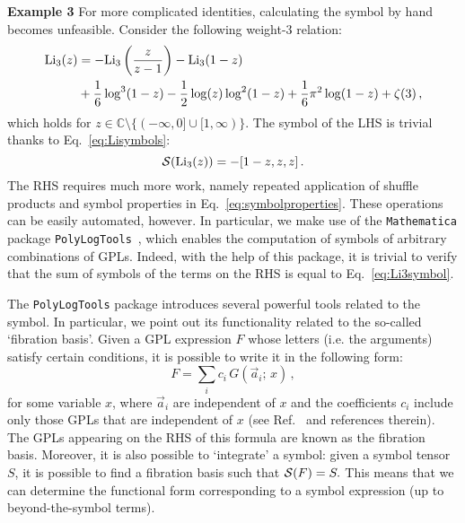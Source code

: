 \documentclass[main.tex]{subfiles}
\begin{document}
\textbf{Example 3} \newline
For more complicated identities, calculating the symbol by hand becomes unfeasible. Consider the following weight-3 relation:
\begin{align}
    \text{Li}_3(z)&=-\text{Li}_3\left(\frac{z}{z-1}\right)-\text{Li}_3(1-z) \nonumber \\
    &+\frac{1}{6} \log ^3(1-z)-\frac{1}{2} \log (z) \log ^2(1-z)+\frac{1}{6} \pi ^2 \log (1-z)+\zeta (3)\,,
\end{align}
which holds for $z \in \mathbb{C} \setminus\{(-\infty, 0] \cup [1, \infty)\}$. The symbol of the LHS is trivial thanks to Eq.~\ref{eq:Lisymbols}:
\begin{equation} \label{eq:Li3symbol}
    \mathcal{S}(\text{Li}_3(z)) = -[1-z,z,z]\,.
\end{equation}
The RHS requires much more work, namely repeated application of shuffle products and symbol properties in Eq.~\ref{eq:symbolproperties}. These operations can be easily automated, however. In particular, we make use of the \texttt{Mathematica} package \texttt{PolyLogTools}~\cite{Duhr:2019tlz}, which enables the computation of symbols of arbitrary combinations of GPLs. Indeed, with the help of this package, it is trivial to verify that the sum of symbols of the terms on the RHS is equal to Eq.~\ref{eq:Li3symbol}.

The \texttt{PolyLogTools} package introduces several powerful tools related to the symbol. In particular, we point out its functionality related to the so-called `fibration basis'. Given a GPL expression $F$ whose letters (i.e. the arguments) satisfy certain conditions, it is possible to write it in the following form:
\begin{equation}
    F = \sum_i c_i\, G(\vec{a}_i;\, x)\,,
\end{equation}
for some variable $x$, where $\vec{a}_i$ are independent of $x$ and the coefficients $c_i$ include only those GPLs that are independent of $x$ (see Ref.~\cite{Duhr:2019tlz} and references therein). The GPLs appearing on the RHS of this formula are known as the fibration basis. Moreover, it is also possible to `integrate' a symbol: given a symbol tensor $S$, it is possible to find a fibration basis such that $\mathcal{S}(F) = S.$  This means that we can determine the functional form corresponding to a symbol expression (up to beyond-the-symbol terms). 
\end{document}
